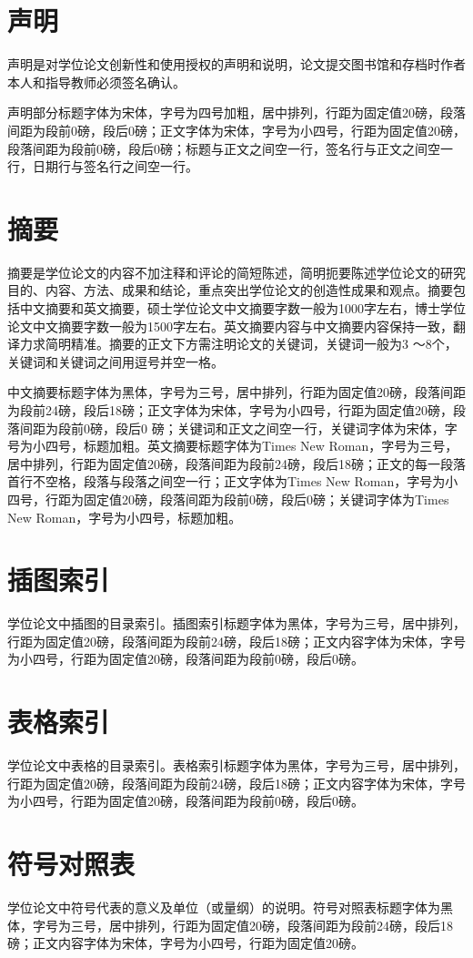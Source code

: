 \section{声明}
声明是对学位论文创新性和使用授权的声明和说明，论文提交图书馆和存档时作者本人和指导教师必须签名确认。
\par
声明部分标题字体为宋体，字号为四号加粗，居中排列，行距为固定值20磅，段落间距为段前0磅，段后0磅；正文字体为宋体，字号为小四号，行距为固定值20磅，段落间距为段前0磅，段后0磅；标题与正文之间空一行，签名行与正文之间空一行，日期行与签名行之间空一行。
\section{摘要}
摘要是学位论文的内容不加注释和评论的简短陈述，简明扼要陈述学位论文的研究目的、内容、方法、成果和结论，重点突出学位论文的创造性成果和观点。摘要包括中文摘要和英文摘要，硕士学位论文中文摘要字数一般为1000字左右，博士学位论文中文摘要字数一般为1500字左右。英文摘要内容与中文摘要内容保持一致，翻译力求简明精准。摘要的正文下方需注明论文的关键词，关键词一般为3 ～8个，关键词和关键词之间用逗号并空一格。
\par
中文摘要标题字体为黑体，字号为三号，居中排列，行距为固定值20磅，段落间距为段前24磅，段后18磅；正文字体为宋体，字号为小四号，行距为固定值20磅，段落间距为段前0磅，段后0 磅；关键词和正文之间空一行，关键词字体为宋体，字号为小四号，标题加粗。英文摘要标题字体为Times New Roman，字号为三号，居中排列，行距为固定值20磅，段落间距为段前24磅，段后18磅；正文的每一段落首行不空格，段落与段落之间空一行；正文字体为Times New Roman，字号为小四号，行距为固定值20磅，段落间距为段前0磅，段后0磅；关键词字体为Times New Roman，字号为小四号，标题加粗。
\section{插图索引}
学位论文中插图的目录索引。插图索引标题字体为黑体，字号为三号，居中排列，行距为固定值20磅，段落间距为段前24磅，段后18磅；正文内容字体为宋体，字号为小四号，行距为固定值20磅，段落间距为段前0磅，段后0磅。
\section{表格索引}
学位论文中表格的目录索引。表格索引标题字体为黑体，字号为三号，居中排列，行距为固定值20磅，段落间距为段前24磅，段后18磅；正文内容字体为宋体，字号为小四号，行距为固定值20磅，段落间距为段前0磅，段后0磅。
\section{符号对照表}
学位论文中符号代表的意义及单位（或量纲）的说明。符号对照表标题字体为黑体，字号为三号，居中排列，行距为固定值20磅，段落间距为段前24磅，段后18磅；正文内容字体为宋体，字号为小四号，行距为固定值20磅。
